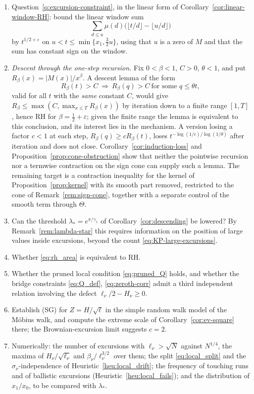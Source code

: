 \documentclass[11pt]{amsart}
\numberwithin{equation}{section}
\theoremstyle{plain}
\theoremstyle{definition}
\theoremstyle{remark}
\newcommand{\eps}{\varepsilon}
\begin{document}
\begin{enumerate}[label=\textup{(\arabic*)}]
\item Question~\ref{q:excursion-constraint}, in the linear form of
Corollary~\ref{cor:linear-window-RH}: bound the linear window sum
\[
\sum_{d\le u}\mu(d)\bigl(\lfloor t/d\rfloor-\lfloor u/d\rfloor\bigr)
\]
by $t^{1/2+\eps}$ on $u<t\le\min\{x_1,\frac32u\}$, using that $u$ is a zero of
$M$ and that the sum has constant sign on the window.
\item \emph{Descent through the one-step recursion.} Fix $0<\beta<1$,
$C>0$, $\theta<1$, and put $R_\beta(x)=|M(x)|/x^\beta$. A descent lemma of
the form
\[
R_\beta(t)>C\ \Longrightarrow\ R_\beta(q)>C\ \text{for some }q\le\theta t,
\]
valid for all $t$ with the \emph{same} constant $C$, would give
$R_\beta\le\max(C,\max_{x\le T}R_\beta(x))$ by iteration down to a finite
range $[1,T]$, hence RH for $\beta=\frac12+\eps$; given the finite range the
lemma is equivalent to this conclusion, and its interest lies in the
mechanism. A version losing a factor $c<1$ at each step,
$R_\beta(q)\ge cR_\beta(t)$, loses $t^{-\log(1/c)/\log(1/\theta)}$ after
iteration and does not close. Corollary~\ref{cor:induction-loss} and
Proposition~\ref{prop:cone-obstruction} show that neither the pointwise
recursion nor a termwise contraction on the sign cone can supply such a
lemma. The remaining target is a contraction inequality for the kernel of
Proposition~\ref{prop:kernel} with its smooth part removed, restricted to
the cone of Remark~\ref{rem:sign-cone}, together with a separate control of
the smooth term through $\Theta$.
\item Can the threshold $\lambda_*=e^{\pi/\gamma_1}$ of
Corollary~\ref{cor:descending} be lowered? By
Remark~\ref{rem:lambda-star} this requires information on the position of
large values inside excursions, beyond the count
\eqref{eq:KP-large-excursions}.
\item Whether \eqref{eq:rh_area} is equivalent to RH.
\item Whether the pruned local condition \eqref{eq:pruned_Q} holds, and
whether the bridge constraints \eqref{eq:Q_def}, \eqref{eq:zeroth-corr}
admit a third independent relation involving the defect
$\ell_\nu/2-H_\nu\ge0$.
\item Establish (SG) for $Z=H/\sqrt\ell$ in the simple random walk model of
the M\"obius walk, and compute the extreme scale of
Corollary~\ref{cor:ev-square} there; the Brownian-excursion limit suggests
$c=2$.
\item Numerically: the number of excursions with $\ell_\nu>\sqrt N$ against
$N^{1/4}$, the maxima of $H_\nu/\sqrt{\ell_\nu}$ and $\beta_\nu/\ell_\nu^{3/2}$
over them; the split \eqref{eq:local_split} and the $\sigma_\nu$-independence
of Heuristic~\ref{heu:local_drift}; the frequency of touching runs and of
ballistic excursions (Heuristic~\ref{heu:local_fails}); and the distribution
of $x_1/x_0$, to be compared with $\lambda_*$.
\end{enumerate}
\end{document}

